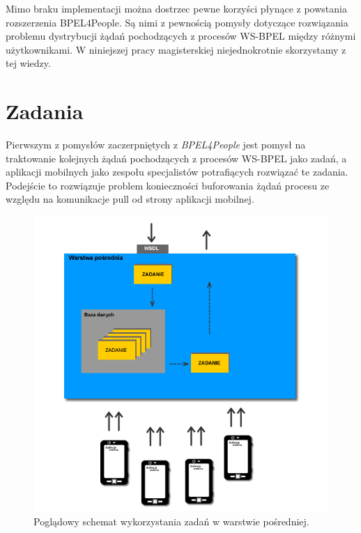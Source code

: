 Mimo braku implementacji można dostrzec pewne korzyści płynące z powstania rozszerzenia BPEL4People. Są nimi z pewnością pomysły dotyczące rozwiązania problemu dystrybucji żądań pochodzących z procesów WS-BPEL między różnymi użytkownikami. W niniejszej pracy magisterskiej niejednokrotnie skorzystamy z tej wiedzy. 


\section{Zadania}
\label{sec:tasks}

Pierwszym z pomysłów zaczerpniętych z \textit{BPEL4People} jest pomysł na traktowanie kolejnych żądań pochodzących z procesów WS-BPEL jako zadań, a aplikacji mobilnych jako zespołu specjalistów potrafiących rozwiązać te zadania. Podejście to rozwiązuje problem konieczności buforowania żądań procesu ze względu na komunikacje pull od strony aplikacji mobilnej. 

\begin{figure}[h]
\centerline{\includegraphics[scale=0.5]{middlewareTasksConceptDiagram}}
\caption{Poglądowy schemat wykorzystania zadań w warstwie pośredniej.}
\label{fig:middlewareTasksConceptDiagram}
\end{figure}

